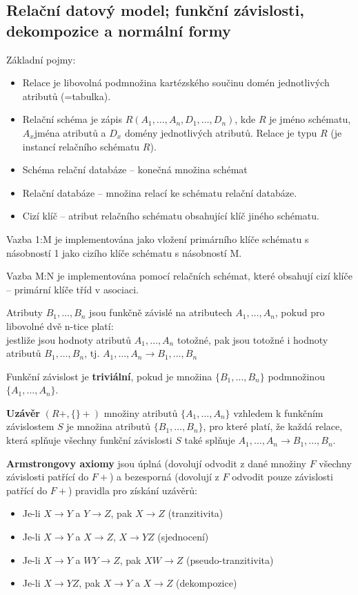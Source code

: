 \subsection{Relační datový model; funkční závislosti, dekompozice a normální formy}
Základní pojmy:
\begin{itemize}
\item Relace je libovolná podmnožina kartézského součinu domén jednotlivých atributů (=tabulka).
\item Relační schéma je zápis $R(A_1, \ldots, A_n, D_1, \ldots, D_n)$, kde $R$ je jméno schématu, $A_x$jména atributů a $D_x$ domény jednotlivých atributů. Relace je typu $R$ (je instancí relačního schématu $R$).
\item Schéma relační databáze – konečná množina schémat
\item Relační databáze – množina relací ke schématu relační databáze.
\item Cizí klíč – atribut relačního schématu obsahující klíč jiného schématu.
\end{itemize}

Vazba 1:M je implementována jako vložení primárního klíče schématu s násobností 1 jako cizího klíče schématu s násobností M.

Vazba M:N je implementována pomocí relačních schémat, které obsahují cizí klíče – primární klíče tříd v asociaci.

Atributy $B_1,\ldots ,B_n$ jsou funkčně závislé na atributech $A_1,\ldots ,A_n$, pokud pro libovolné dvě n-tice platí: \\
jestliže jsou hodnoty atributů $A_1,\ldots ,A_n$ totožné, pak jsou totožné i hodnoty atributů $B_1,\ldots ,B_n$, tj. $A_1,\ldots ,A_n \rightarrow B_1,\ldots ,B_n$

Funkční závislost je \textbf{triviální}, pokud je množina $\{B_1,\ldots ,B_n\}$ podmnožinou $\{A_1,\ldots ,A_n\}$.

\textbf{Uzávěr} $(R+, \{\}+)$ množiny atributů $\{A_1,\ldots ,A_n\}$ vzhledem k funkčním závislostem $S$ je množina atributů $\{B_1,\ldots ,B_n\}$, pro které platí, že každá relace, která splňuje všechny funkční závislosti $S$ také splňuje $A_1,\ldots ,A_n \rightarrow B_1,\ldots ,B_n$.

\textbf{Armstrongovy axiomy} jsou úplná (dovolují odvodit z dané množiny $F$ všechny závislosti patřící do $F+$) a bezesporná (dovolují z $F$ odvodit pouze závislosti patřící do $F+$) pravidla pro získání uzávěrů:
\begin{itemize}
\item Je-li $X \rightarrow Y$ a $Y \rightarrow Z$, pak $X \rightarrow Z$ (tranzitivita)
\item Je-li $X \rightarrow Y$ a $X \rightarrow Z$, $X \rightarrow YZ$ (sjednocení)
\item Je-li $X \rightarrow Y$ a $WY \rightarrow Z$, pak $XW \rightarrow Z$ (pseudo-tranzitivita)
\item Je-li $X \rightarrow YZ$, pak $X \rightarrow Y$ a $X \rightarrow Z$ (dekompozice) 
\end{itemize}

